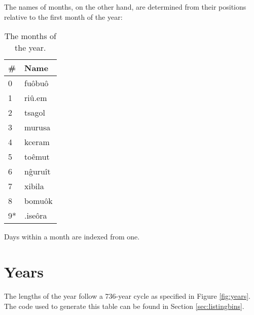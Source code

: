 \documentclass{book}
\begin{document}
The names of months, on the other hand, are determined from their positions relative to the first month of the year:

\begin{table}[ht]
    \caption{The months of the year.}
    \centering
    \begin{tabular}{|l|>{\kardinal}l|}
        \hline
        \# & \textnormal{Name} \\
        \hline
        0 & fu\^obu\^o \\
        1 & ri\^u.em \\
        2 & tsagol \\
        3 & murusa \\
        4 & kceram \\
        5 & to\^emut \\
        6 & n\^guru\^it \\
        7 & xibila \\
        8 & bomu\^ok \\
        \hline
        9* & .ise\^ora \\
        \hline
    \end{tabular}
\end{table}

Days within a month are indexed from one.

\section{Years}

The lengths of the year follow a 736-year cycle as specified in Figure \ref{fig:years}.
The code used to generate this table can be found in Section \ref{sec:listingbins}.
\end{document}

